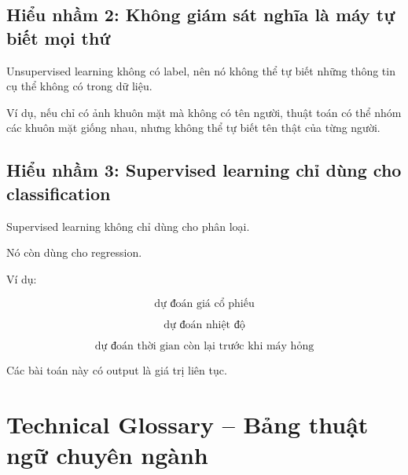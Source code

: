 \subsection{Hiểu nhầm 2: Không giám sát nghĩa là máy tự biết mọi thứ}

Unsupervised learning không có label, nên nó không thể tự biết những thông tin cụ thể không có trong dữ liệu.

Ví dụ, nếu chỉ có ảnh khuôn mặt mà không có tên người, thuật toán có thể nhóm các khuôn mặt giống nhau, nhưng không thể tự biết tên thật của từng người.

\subsection{Hiểu nhầm 3: Supervised learning chỉ dùng cho classification}

Supervised learning không chỉ dùng cho phân loại.

Nó còn dùng cho regression.

Ví dụ:

\[
    \text{dự đoán giá cổ phiếu}
\]

\[
    \text{dự đoán nhiệt độ}
\]

\[
    \text{dự đoán thời gian còn lại trước khi máy hỏng}
\]

Các bài toán này có output là giá trị liên tục.

\section{Technical Glossary -- Bảng thuật ngữ chuyên ngành}

